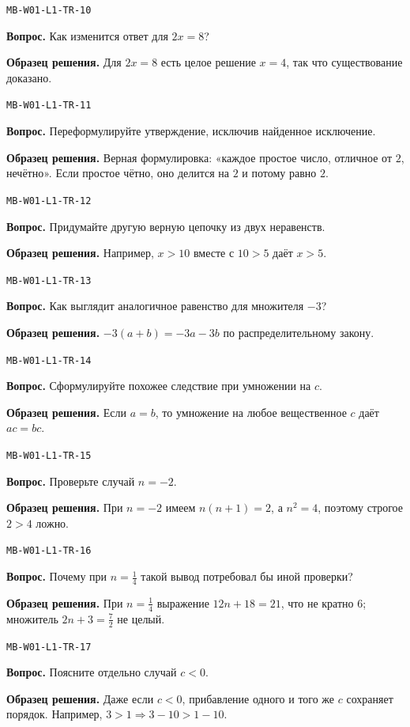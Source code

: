 \documentclass[11pt,a4paper,openany]{book}
\newcommand{\muid}[1]{\texttt{\footnotesize #1}}
\begin{document}
\noindent\muid{MB-W01-L1-TR-10}\par \textbf{Вопрос.} Как изменится ответ для $2x=8$?\par 
\textbf{Образец решения.} Для $2x=8$ есть целое решение $x=4$, так что существование доказано.\medskip

\noindent\muid{MB-W01-L1-TR-11}\par \textbf{Вопрос.} Переформулируйте утверждение, исключив найденное исключение.\par 
\textbf{Образец решения.} Верная формулировка: «каждое простое число, отличное от $2$, нечётно». Если простое чётно, оно делится на $2$ и потому равно $2$.\medskip

\noindent\muid{MB-W01-L1-TR-12}\par \textbf{Вопрос.} Придумайте другую верную цепочку из двух неравенств.\par 
\textbf{Образец решения.} Например, $x>10$ вместе с $10>5$ даёт $x>5$.\medskip

\noindent\muid{MB-W01-L1-TR-13}\par \textbf{Вопрос.} Как выглядит аналогичное равенство для множителя $-3$?\par 
\textbf{Образец решения.} $-3(a+b)=-3a-3b$ по распределительному закону.\medskip

\noindent\muid{MB-W01-L1-TR-14}\par \textbf{Вопрос.} Сформулируйте похожее следствие при умножении на $c$.\par 
\textbf{Образец решения.} Если $a=b$, то умножение на любое вещественное $c$ даёт $ac=bc$.\medskip

\noindent\muid{MB-W01-L1-TR-15}\par \textbf{Вопрос.} Проверьте случай $n=-2$.\par 
\textbf{Образец решения.} При $n=-2$ имеем $n(n+1)=2$, а $n^2=4$, поэтому строгое $2>4$ ложно.\medskip

\noindent\muid{MB-W01-L1-TR-16}\par \textbf{Вопрос.} Почему при $n=\tfrac14$ такой вывод потребовал бы иной проверки?\par 
\textbf{Образец решения.} При $n=\tfrac14$ выражение $12n+18=21$, что не кратно $6$; множитель $2n+3=\tfrac72$ не целый.\medskip

\noindent\muid{MB-W01-L1-TR-17}\par \textbf{Вопрос.} Поясните отдельно случай $c<0$.\par 
\textbf{Образец решения.} Даже если $c<0$, прибавление одного и того же $c$ сохраняет порядок. Например, $3>1\Rightarrow3-10>1-10$.\medskip
\end{document}
